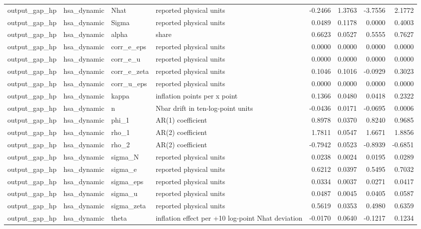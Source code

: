 \begin{tabular}{llllrrrr}
output\_gap\_hp & hsa\_dynamic & Nhat & reported physical units & -0.2466 & 1.3763 & -3.7556 & 2.1772 \\
output\_gap\_hp & hsa\_dynamic & Sigma & reported physical units & 0.0489 & 0.1178 & 0.0000 & 0.4003 \\
output\_gap\_hp & hsa\_dynamic & alpha & share & 0.6623 & 0.0527 & 0.5555 & 0.7627 \\
output\_gap\_hp & hsa\_dynamic & corr\_e\_eps & reported physical units & 0.0000 & 0.0000 & 0.0000 & 0.0000 \\
output\_gap\_hp & hsa\_dynamic & corr\_e\_u & reported physical units & 0.0000 & 0.0000 & 0.0000 & 0.0000 \\
output\_gap\_hp & hsa\_dynamic & corr\_e\_zeta & reported physical units & 0.1046 & 0.1016 & -0.0929 & 0.3023 \\
output\_gap\_hp & hsa\_dynamic & corr\_u\_eps & reported physical units & 0.0000 & 0.0000 & 0.0000 & 0.0000 \\
output\_gap\_hp & hsa\_dynamic & kappa & inflation points per x point & 0.1366 & 0.0480 & 0.0418 & 0.2322 \\
output\_gap\_hp & hsa\_dynamic & n & Nbar drift in ten-log-point units & -0.0436 & 0.0171 & -0.0695 & 0.0006 \\
output\_gap\_hp & hsa\_dynamic & phi\_1 & AR(1) coefficient & 0.8978 & 0.0370 & 0.8240 & 0.9685 \\
output\_gap\_hp & hsa\_dynamic & rho\_1 & AR(2) coefficient & 1.7811 & 0.0547 & 1.6671 & 1.8856 \\
output\_gap\_hp & hsa\_dynamic & rho\_2 & AR(2) coefficient & -0.7942 & 0.0523 & -0.8939 & -0.6851 \\
output\_gap\_hp & hsa\_dynamic & sigma\_N & reported physical units & 0.0238 & 0.0024 & 0.0195 & 0.0289 \\
output\_gap\_hp & hsa\_dynamic & sigma\_e & reported physical units & 0.6212 & 0.0397 & 0.5495 & 0.7032 \\
output\_gap\_hp & hsa\_dynamic & sigma\_eps & reported physical units & 0.0334 & 0.0037 & 0.0271 & 0.0417 \\
output\_gap\_hp & hsa\_dynamic & sigma\_u & reported physical units & 0.0487 & 0.0045 & 0.0405 & 0.0587 \\
output\_gap\_hp & hsa\_dynamic & sigma\_zeta & reported physical units & 0.5619 & 0.0353 & 0.4980 & 0.6359 \\
output\_gap\_hp & hsa\_dynamic & theta & inflation effect per +10 log-point Nhat deviation & -0.0170 & 0.0640 & -0.1217 & 0.1234 \\

\end{tabular}
